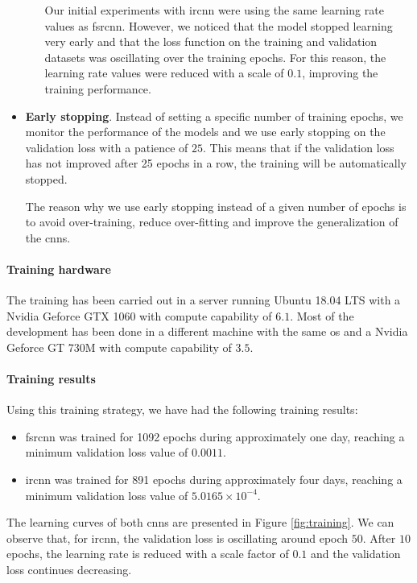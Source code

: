 \begin{itemize}
\begin{itemize}
		Our initial experiments with \gls{ircnn} were using the same learning rate values as \gls{fsrcnn}. However, we noticed that the model stopped learning very early and that the loss function on the training and validation datasets was oscillating over the training epochs. For this reason, the learning rate values were reduced with a scale of $0.1$, improving the training performance.
	\end{itemize}
    \item \textbf{Early stopping}. Instead of setting a specific number of training epochs, we monitor the performance of the models and we use early stopping on the validation loss with a patience of $25$. This means that if the validation loss has not improved after 25 epochs in a row, the training will be automatically stopped.
    
    The reason why we use early stopping instead of a given number of epochs is to avoid over-training,   reduce over-fitting and improve the generalization of the \glspl{cnn}.

\end{itemize}

\paragraph{Training hardware}
The training has been carried out in a server running Ubuntu 18.04 LTS with a Nvidia Geforce GTX 1060 with compute capability of $6.1$. Most of the development has been done in a different machine with the same \gls{os} and a Nvidia Geforce GT 730M with compute capability of $3.5$.

\paragraph{Training results}
Using this training strategy, we have had the following training results:
\begin{itemize}
	\item \gls{fsrcnn} was trained for 1092 epochs during approximately one day, reaching a minimum validation loss value of $0.0011$.
	\item \gls{ircnn} was trained for 891 epochs during approximately four days, reaching a minimum validation loss value of $5.0165\times10^{-4}$.
\end{itemize}

The learning curves of both \glspl{cnn} are presented in Figure \ref{fig:training}. We can observe that, for \gls{ircnn}, the validation loss is oscillating around epoch $50$. After $10$ epochs, the learning rate is reduced with a scale factor of $0.1$ and the validation loss continues decreasing.


